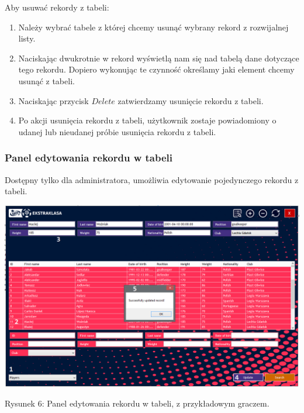 \documentclass[12pt,a4paper]{article}
\begin{document}
    Aby usuwać rekordy z tabeli:
    \begin{enumerate}
        \item Należy wybrać tabele z której chcemy usunąć wybrany rekord z rozwijalnej listy.
        \item Naciskając dwukrotnie w rekord wyświetlą nam się nad tabelą dane dotyczące tego rekordu. Dopiero wykonując te czynność określamy jaki element chcemy usunąć z tabeli.
        \item Naciskając przycisk $Delete$ zatwierdzamy usunięcie rekordu z tabeli.
        \item Po akcji usunięcia rekordu z tabeli, użytkownik zostaje powiadomiony o udanej lub nieudanej próbie usunięcia rekordu z tabeli.
    \end{enumerate}
    
    \newpage
    
    \subsubsection{Panel edytowania rekordu w tabeli}
    Dostępny tylko dla administratora, umożliwia edytowanie pojedynczego rekordu z tabeli.
    \begin{center}
        \includegraphics[scale=0.47]{update-panel.png}
        \begin{flushleft}
            \begin{scriptsize}
            \begin{list}{}{\leftmargin=13.5em}\raggedright\item\relax
            Rysunek 6: Panel edytowania rekordu w tabeli, z przykładowym graczem.
            \end{list}
            \end{scriptsize}
        \end{flushleft}
    \end{center}
    
\end{document}
